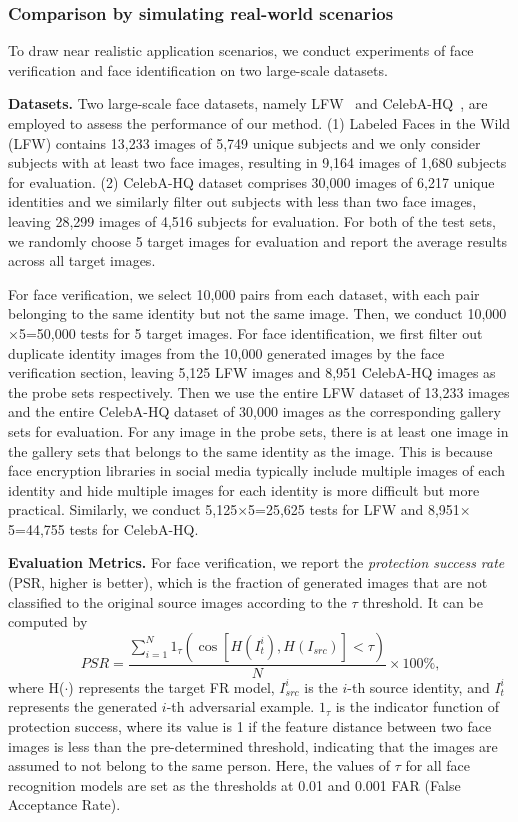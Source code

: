 \documentclass[10pt,journal,compsoc]{IEEEtran}
\begin{document}
\subsubsection{Comparison by simulating real-world scenarios}
To draw near realistic application scenarios, we conduct experiments of face verification and face identification on two large-scale datasets. 

\textbf{Datasets.}
Two large-scale face datasets, namely LFW~\cite{huang2008labeled} and CelebA-HQ~\cite{karras2018progressive}, are employed to assess the performance of our method. (1) Labeled Faces in the Wild (LFW) contains 13,233 images of 5,749 unique subjects and we only consider subjects with at least two face images, resulting in 9,164 images of 1,680 subjects for evaluation. (2) CelebA-HQ dataset comprises 30,000 images of 6,217 unique identities and we similarly filter out subjects with less than two face images, leaving 28,299 images of 4,516 subjects for evaluation.
For both of the test sets, we randomly choose 5 target images for evaluation and report the average results across all target images.

For face verification, we select 10,000 pairs from each dataset, with each pair belonging to the same identity but not the same image. Then, we conduct 10,000$\times$5=50,000 tests for 5 target images. For face identification, we first filter out duplicate identity images from the 10,000 generated images by the face verification section, leaving 5,125 LFW images and 8,951 CelebA-HQ images as the probe sets respectively. Then we use the entire LFW dataset of 13,233 images and the entire CelebA-HQ dataset of 30,000 images as the corresponding gallery sets for evaluation. 
For any image in the probe sets, there is at least one image in the gallery sets that belongs to the same identity as the image. This is because face encryption libraries in social media typically include multiple images of each identity and hide multiple images for each identity is more difficult but more practical. Similarly, we conduct 5,125$\times$5=25,625 tests for LFW and 8,951$\times$5=44,755 tests for CelebA-HQ.

\textbf{Evaluation Metrics.}
For face verification, we report the \emph{protection success rate} (PSR, higher is better), which is the fraction of generated images that are not classified to the original source images according to the $\tau$ threshold. It can be computed by
\begin{equation}
	PSR=\frac{\sum_{i=1}^{N} 1_{\tau}\left(\cos \left[H\left(I_{t}^{i}\right), H\left({I}_{src}\right)\right]<\tau\right)}{N} \times 100 \%\text{,}
\label{eq:psr}
\end{equation}
where H($\cdot$) represents the target FR model, $I_{src}^i$ is the $i$-th source identity, and $I_t^i$ represents the generated $i$-th adversarial example. $1_{\tau}$ is the indicator function of protection success, where its value is 1 if the feature distance between two face images is less than the pre-determined threshold, indicating that the images are assumed to not belong to the same person. Here, the values of $\tau$ for all face recognition models are set as the thresholds at 0.01 and 0.001 FAR (False Acceptance Rate). 
\end{document}
